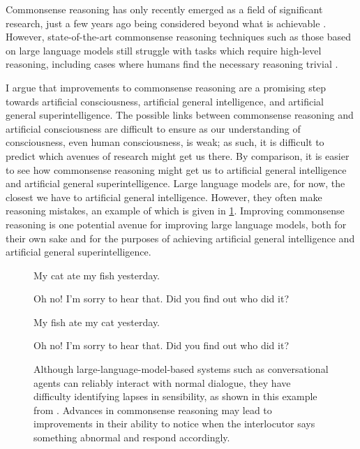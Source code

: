 \documentclass[12pt]{report}
\begin{document}
Commonsense reasoning has only recently emerged as a field of significant research, just a few years ago being considered beyond what is achievable \cite{Choi2022-to}.
However, state-of-the-art commonsense reasoning techniques such as those based on large language models still struggle with tasks which require high-level reasoning, including cases where humans find the necessary reasoning trivial \cite{Richardson2023-mq}.

I argue that improvements to commonsense reasoning are a promising step towards artificial consciousness, artificial general intelligence, and artificial general superintelligence.
The possible links between commonsense reasoning and artificial consciousness are difficult to ensure as our understanding of consciousness, even human consciousness, is weak; as such, it is difficult to predict which avenues of research might get us there.
By comparison, it is easier to see how commonsense reasoning might get us to artificial general intelligence and artificial general superintelligence.
Large language models are, for now, the closest we have to artificial general intelligence.
However, they often make reasoning mistakes, an example of which is given in \cref{fig:fish-ate-cat}.
Improving commonsense reasoning is one potential avenue for improving large language models, both for their own sake and for the purposes of achieving artificial general intelligence and artificial general superintelligence.

\begin{figure}
    \begin{minipage}{.5\textwidth}
        \begin{rightbubbles}
            My cat ate my fish yesterday. 
        \end{rightbubbles}
        \begin{leftbubbles}
            Oh no!
            I'm sorry to hear that.
            Did you find out who did it?
        \end{leftbubbles}
    \end{minipage}
    \begin{minipage}{.5\textwidth}
        \begin{rightbubbles}
            My fish ate my cat yesterday. 
        \end{rightbubbles}
        \begin{leftbubbles}
            Oh no!
            I'm sorry to hear that.
            Did you find out who did it?
        \end{leftbubbles}
    \end{minipage}
    \caption{
        Although large-language-model-based systems such as conversational agents can reliably interact with normal dialogue, they have difficulty identifying lapses in sensibility, as shown in this example from \cite{Richardson2023-mq}. 
        Advances in commonsense reasoning may lead to improvements in their ability to notice when the interlocutor says something abnormal and respond accordingly.}
    \label{fig:fish-ate-cat}
\end{figure}
\end{document}
